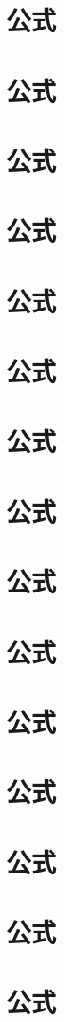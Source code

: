 \chapter{公式}
\chapter{公式}
\chapter{公式}
\chapter{公式}
\chapter{公式}
\chapter{公式}
\chapter{公式}
\chapter{公式}
\chapter{公式}
\chapter{公式}
\chapter{公式}
\chapter{公式}
\chapter{公式}
\chapter{公式}
\chapter{公式}
